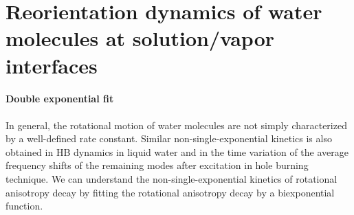 {%
\section{Reorientation dynamics of water molecules at solution/vapor interfaces}
\paragraph{Double exponential fit}
In general, the rotational motion of water molecules are not simply characterized by a well-defined rate constant. 
Similar non-single-exponential kinetics is also obtained in HB dynamics 
in liquid water\cite{AL96,Dirama2005} and in the time variation of the average frequency shifts of the 
remaining modes after excitation in hole burning technique\cite{Rey2002,Moller2004}.
We can understand the non-single-exponential kinetics of rotational 
anisotropy decay by fitting the rotational anisotropy decay by a 
biexponential function.

}
